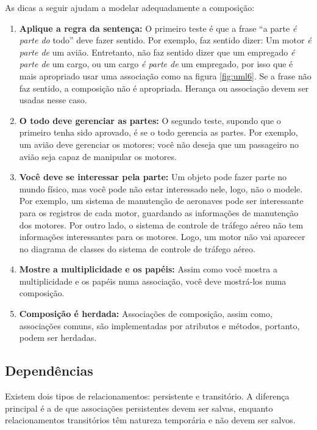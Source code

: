 As dicas a seguir ajudam a modelar adequadamente a composição:
\begin{enumerate}
\item \textbf{Aplique a regra da sentença:} O primeiro teste é que a frase ``a parte \emph{é parte do} todo'' deve fazer sentido. Por exemplo, faz sentido dizer: Um motor \emph{é parte de} um avião. Entretanto, não faz sentido dizer que um empregado \emph{é parte de} um cargo, ou um cargo \emph{é parte de} um empregado, por isso que é mais apropriado usar uma associação como na figura \ref{fig:uml6}. Se a frase não faz sentido, a composição não é apropriada. Herança ou associação devem ser usadas nesse caso.

\item \textbf{O todo deve gerenciar as partes:} O segundo teste, supondo que o primeiro tenha sido aprovado, é se o todo gerencia as partes. Por exemplo, um avião deve gerenciar os motores; você não deseja que um passageiro no avião seja capaz de manipular os motores.

\item \textbf{Você deve se interessar pela parte:} Um objeto pode fazer parte no mundo físico, mas você pode não estar interessado nele, logo, não o modele. Por exemplo, um sistema de manutenção de aeronaves pode ser interessante para os registros de cada motor, guardando as informações de manutenção dos motores. Por outro lado, o sistema de controle de tráfego aéreo não tem informações interessantes para os motores. Logo, um motor não vai aparecer no diagrama de classes do sistema de controle de tráfego aéreo.

\item \textbf{Mostre a multiplicidade e os papéis:} Assim como você mostra a multiplicidade e os papéis numa associação, você deve mostrá-los numa composição.

\item \textbf{Composição é herdada:} Associações de composição, assim como, associações comuns, são implementadas por atributos e métodos, portanto, podem ser herdadas.
\end{enumerate}

\subsection{Dependências}

Existem dois tipos de relacionamentos: persistente e transitório. A diferença principal é a de que associações persistentes devem ser salvas, enquanto relacionamentos transitórios têm natureza temporária e não devem ser salvos.

